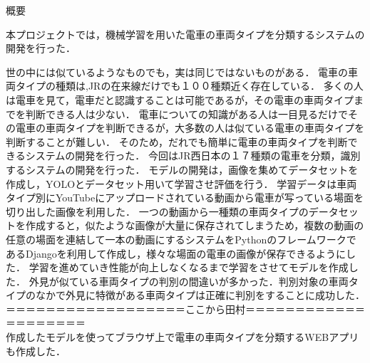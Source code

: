 

\begin{center}
		{\gtfamily \Large 概要}
\end{center}
\vspace{1cm}
\thispagestyle{empty}	



本プロジェクトでは，機械学習を用いた電車の車両タイプを分類するシステムの開発を行った．

世の中には似ているようなものでも，実は同じではないものがある．
電車の車両タイプの種類は,JRの在来線だけでも１００種類近く存在している．
多くの人は電車を見て，電車だと認識することは可能であるが，その電車の車両タイプまでを判断できる人は少ない．
電車についての知識がある人は一目見るだけでその電車の車両タイプを判断できるが，大多数の人は似ている電車の車両タイプを判断することが難しい．
そのため，だれでも簡単に電車の車両タイプを判断できるシステムの開発を行った．
今回はJR西日本の１７種類の電車を分類，識別するシステムの開発を行った．
モデルの開発は，画像を集めてデータセットを作成し，YOLOとデータセット用いて学習させ評価を行う．
学習データは車両タイプ別にYouTubeにアップロードされている動画から電車が写っている場面を切り出した画像を利用した．
一つの動画から一種類の車両タイプのデータセットを作成すると，似たような画像が大量に保存されてしまうため，複数の動画の任意の場面を連結して一本の動画にするシステムをPythonのフレームワークであるDjangoを利用して作成し，様々な場面の電車の画像が保存できるようにした．
学習を進めていき性能が向上しなくなるまで学習をさせてモデルを作成した．
外見が似ている車両タイプの判別の間違いが多かった．判別対象の車両タイプのなかで外見に特徴がある車両タイプは正確に判別をすることに成功した．
＝＝＝＝＝＝＝＝＝＝＝＝＝＝＝＝＝＝ここから田村＝＝＝＝＝＝＝＝＝＝＝＝＝＝＝＝＝＝＝＝\\
作成したモデルを使ってブラウザ上で電車の車両タイプを分類するWEBアプリも作成した．\\

\clearpage
